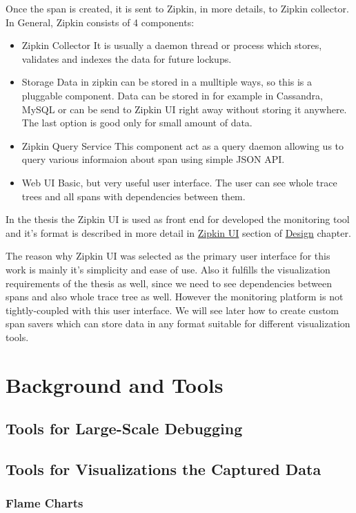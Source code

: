 Once the span is created, it is sent to Zipkin, in more details, to Zipkin collector. In General, Zipkin consists of 4 components:
\begin{itemize}
	\item Zipkin Collector
	It is usually a daemon thread or process which stores, validates and indexes the data for future lockups.
	\item Storage
	Data in zipkin can be stored in a mulltiple ways, so this is a pluggable component. Data can be stored in for example in Cassandra, MySQL or can be send to Zipkin UI right away without storing it anywhere. The last option is good only for small amount of data.
	\item Zipkin Query Service
	This component act as a query daemon allowing us to query various informaion about span using simple JSON API.
	\item Web UI
	Basic, but very useful user interface. The user can see whole trace trees and all spans with dependencies between them.
\end{itemize}
 In the thesis the Zipkin UI is used as front end for developed the monitoring tool and it's format is described in more detail in  \hyperref[sec:zipkin_ui]{Zipkin UI} section of \hyperref[chap:design]{Design} chapter.
 
 The reason why Zipkin UI was selected as the primary user interface for this work is mainly it's simplicity and ease of use. Also it fulfills the visualization requirements of the thesis as well, since we need to see dependencies between spans and also whole trace tree as well. However the monitoring platform is not tightly-coupled with this user interface. We will see later how to create custom span savers which can store data in any format suitable for different visualization tools.
\section{Background and Tools}
\subsection{Tools for Large-Scale Debugging}
\subsection{Tools for Visualizations the Captured Data}
\subsubsection{Flame Charts}
